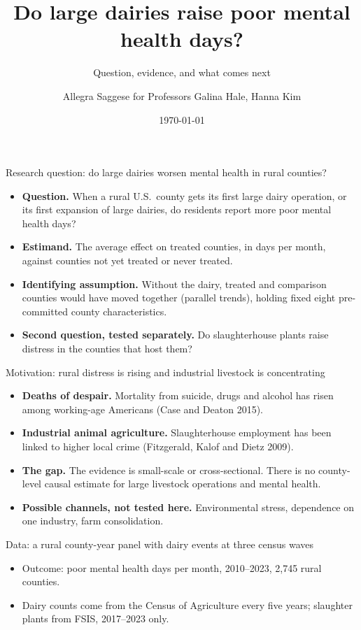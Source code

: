 \documentclass[aspectratio=169]{beamer}
\title{Do large dairies raise poor mental health days?}
\subtitle{Question, evidence, and what comes next}
\author{Allegra Saggese for Professors Galina Hale, Hanna Kim}
\date{\today}
\begin{document}
\begin{frame}\titlepage\end{frame}

\begin{frame}{Research question: do large dairies worsen mental health in rural counties?}
\begin{itemize}\setlength\itemsep{7pt}
  \item[] \textbf{Question.} When a rural U.S.\ county gets its first large dairy operation, or its first expansion of large dairies, do residents report more poor mental health days?
  \item[] \textbf{Estimand.} The average effect on treated counties, in days per month, against counties not yet treated or never treated.
  \item[] \textbf{Identifying assumption.} Without the dairy, treated and comparison counties would have moved together (parallel trends), holding fixed eight pre-committed county characteristics.
  \item[] \textbf{Second question, tested separately.} Do slaughterhouse plants raise distress in the counties that host them?
\end{itemize}
\end{frame}

\begin{frame}{Motivation: rural distress is rising and industrial livestock is concentrating}
\begin{itemize}\setlength\itemsep{7pt}
  \item \textbf{Deaths of despair.} Mortality from suicide, drugs and alcohol has risen among working-age Americans (Case and Deaton 2015).
  \item \textbf{Industrial animal agriculture.} Slaughterhouse employment has been linked to higher local crime (Fitzgerald, Kalof and Dietz 2009).
  \item \textbf{The gap.} The evidence is small-scale or cross-sectional. There is no county-level causal estimate for large livestock operations and mental health.
  \item \textbf{Possible channels, not tested here.} Environmental stress, dependence on one industry, farm consolidation.
\end{itemize}
\end{frame}

\begin{frame}{Data: a rural county-year panel with dairy events at three census waves}

\begin{itemize}\footnotesize\setlength\itemsep{1pt}
  \item Outcome: poor mental health days per month, 2010--2023, 2,745 rural counties.
  \item Dairy counts come from the Census of Agriculture every five years; slaughter plants from FSIS, 2017--2023 only.
\end{itemize}
\end{frame}
\end{document}
